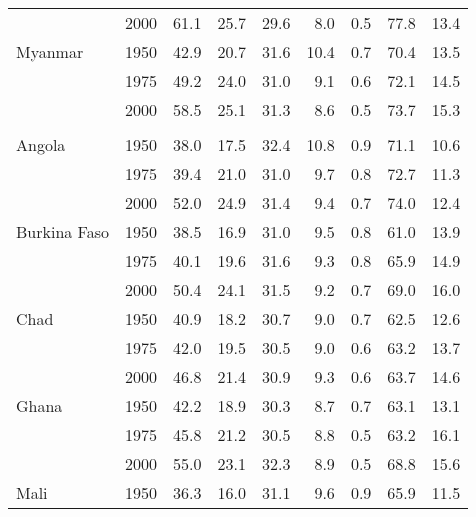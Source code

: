\begin{longtable}[t]{llrrrrrrr}
\hspace{1em} & 2000 & 61.1 & 25.7 & 29.6 & 8.0 & 0.5 & 77.8 & 13.4\\
\hspace{1em}Myanmar & 1950 & 42.9 & 20.7 & 31.6 & 10.4 & 0.7 & 70.4 & 13.5\\
\hspace{1em} & 1975 & 49.2 & 24.0 & 31.0 & 9.1 & 0.6 & 72.1 & 14.5\\
\hspace{1em} & 2000 & 58.5 & 25.1 & 31.3 & 8.6 & 0.5 & 73.7 & 15.3\\
\addlinespace[0.3em]
\multicolumn{9}{l}{\textbf{High mortality}}\\
\hspace{1em}Angola & 1950 & 38.0 & 17.5 & 32.4 & 10.8 & 0.9 & 71.1 & 10.6\\
\hspace{1em} & 1975 & 39.4 & 21.0 & 31.0 & 9.7 & 0.8 & 72.7 & 11.3\\
\hspace{1em} & 2000 & 52.0 & 24.9 & 31.4 & 9.4 & 0.7 & 74.0 & 12.4\\
\hspace{1em}Burkina Faso & 1950 & 38.5 & 16.9 & 31.0 & 9.5 & 0.8 & 61.0 & 13.9\\
\hspace{1em} & 1975 & 40.1 & 19.6 & 31.6 & 9.3 & 0.8 & 65.9 & 14.9\\
\hspace{1em} & 2000 & 50.4 & 24.1 & 31.5 & 9.2 & 0.7 & 69.0 & 16.0\\
\hspace{1em}Chad & 1950 & 40.9 & 18.2 & 30.7 & 9.0 & 0.7 & 62.5 & 12.6\\
\hspace{1em} & 1975 & 42.0 & 19.5 & 30.5 & 9.0 & 0.6 & 63.2 & 13.7\\
\hspace{1em} & 2000 & 46.8 & 21.4 & 30.9 & 9.3 & 0.6 & 63.7 & 14.6\\
\hspace{1em}Ghana & 1950 & 42.2 & 18.9 & 30.3 & 8.7 & 0.7 & 63.1 & 13.1\\
\hspace{1em} & 1975 & 45.8 & 21.2 & 30.5 & 8.8 & 0.5 & 63.2 & 16.1\\
\hspace{1em} & 2000 & 55.0 & 23.1 & 32.3 & 8.9 & 0.5 & 68.8 & 15.6\\
\hspace{1em}Mali & 1950 & 36.3 & 16.0 & 31.1 & 9.6 & 0.9 & 65.9 & 11.5\\

\end{longtable}
